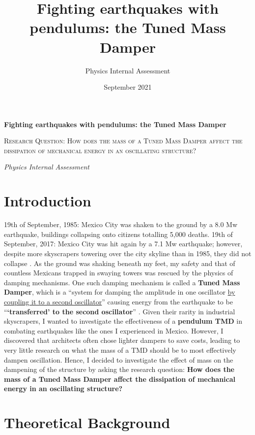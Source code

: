 \documentclass[11pt]{article}
\title{Fighting earthquakes with pendulums: the Tuned Mass Damper}
\author{Physics Internal Assessment
}
\date{September 2021}
\begin{document}
\begin{titlepage}
	\centering
	{\huge\bfseries Fighting earthquakes with pendulums: the Tuned Mass Damper \par}
	\vspace{2cm}
	{\scshape\Large Research Question: How does the mass of a Tuned Mass Damper affect the dissipation of mechanical energy in an oscillating structure? \par}
	\vspace{1.5cm}
	{\Large\itshape Physics Internal Assessment \par}

	\vfill

\end{titlepage}


\clearpage
\section{Introduction}

19th of September, 1985: Mexico City was shaken to the ground by a 8.0 Mw earthquake, buildings collapsing onto citizens totalling 5,000 deaths. 19th of September, 2017: Mexico City was hit again by a 7.1 Mw earthquake; however, despite more skyscrapers towering over the city skyline than in 1985, they did not collapse \cite{source2}. As the ground was shaking beneath my feet, my safety and that of countless Mexicans trapped in swaying towers was rescued by the physics of damping mechanisms. One such damping mechanism is called a \textbf{Tuned Mass Damper}, which is a “system for damping the amplitude in one oscillator \underline{by coupling it to a second oscillator}” causing energy from the earthquake to be “\textbf{‘transferred’ to the second oscillator}” \cite{source1}. Given their rarity in industrial skyscrapers, I wanted to investigate the effectiveness of a \textbf{pendulum TMD} in combating earthquakes like the ones I experienced in Mexico. However, I discovered that architects often chose lighter dampers to save costs, leading to very little research on what the mass of a TMD should be to most effectively dampen oscillation. Hence, I decided to investigate the effect of mass on the dampening of the structure by asking the research question: \textbf{How does the mass of a Tuned Mass Damper affect the dissipation of mechanical energy in an oscillating structure?}

\section{Theoretical Background}
\end{document}
